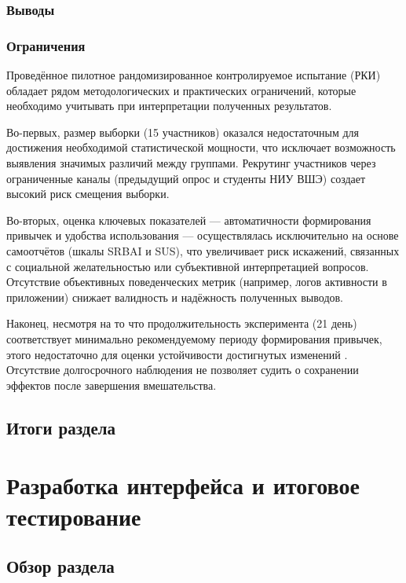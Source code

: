 \documentclass[pdflatex,sn-mathphys-num]{sn-jnl}%
\theoremstyle{thmstyleone}%
\theoremstyle{thmstyletwo}%
\theoremstyle{thmstylethree}%
\begin{document}
\subsubsection{Выводы}

\subsubsection{Ограничения}

Проведённое пилотное рандомизированное контролируемое испытание (РКИ) обладает рядом методологических и практических ограничений, которые необходимо учитывать при интерпретации полученных результатов.

Во-первых, размер выборки (15 участников) оказался недостаточным для достижения необходимой статистической мощности, что исключает возможность выявления значимых различий между группами. Рекрутинг участников через ограниченные каналы (предыдущий опрос и студенты НИУ ВШЭ) создает высокий риск смещения выборки.

Во-вторых, оценка ключевых показателей — автоматичности формирования привычек и удобства использования — осуществлялась исключительно на основе самоотчётов (шкалы SRBAI и SUS), что увеличивает риск искажений, связанных с социальной желательностью или субъективной интерпретацией вопросов. Отсутствие объективных поведенческих метрик (например, логов активности в приложении) снижает валидность и надёжность полученных выводов.

Наконец, несмотря на то что продолжительность эксперимента (21 день) соответствует минимально рекомендуемому периоду формирования привычек, этого недостаточно для оценки устойчивости достигнутых изменений \cite{lally_how_2010}. Отсутствие долгосрочного наблюдения не позволяет судить о сохранении эффектов после завершения вмешательства.

\subsection{Итоги раздела}

\section{Разработка интерфейса и итоговое тестирование}

\subsection{Обзор раздела}
\end{document}
